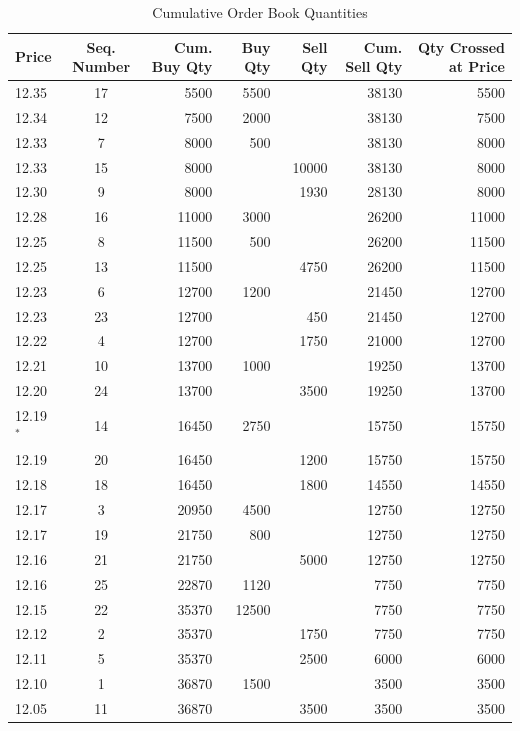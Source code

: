 	\begin{table}[!ht]
   	\centering
   	\caption{Cumulative Order Book Quantities \label{tab:openAuct3}}
   	\begin{tabular}{lcrrrrr}
	Price & Seq. Number & Cum. Buy Qty & Buy Qty & Sell Qty & Cum. Sell Qty & Qty Crossed at Price \\ \hline
	12.35 &  17 & 5500  & 5500 &  & 38130 & 5500 \\
	12.34 & 12 & 7500 & 2000 & & 38130 & 7500  \\	
	12.33 & 7  &  8000 & 500 &  & 38130 & 8000 \\	
	12.33 &  15 & 8000 &  & 10000 & 38130 & 8000 \\	
	12.30 & 9 & 8000 & & 1930 & 28130 & 8000 \\					
	12.28 &  16 & 11000  & 3000 &  & 26200 & 11000 \\	
	12.25 & 8 &  11500 & 500 & & 26200 & 11500 \\	
	12.25 & 13 & 11500 & & 4750 & 26200 & 11500 \\	
	12.23 & 6 &  12700 & 1200 & & 21450 & 12700 \\		
	12.23 &  23 & 12700 & & 450 & 21450 & 12700 \\
	12.22 & 4  & 12700 & & 1750 & 21000 & 12700 \\	
	12.21  & 10 & 13700  & 1000 & & 19250 & 13700 \\		
	12.20 &  24 & 13700 & & 3500 & 19250 & 13700 \\	
	12.19$^*$ &  14 & 16450  & 2750 &  & 15750 & 15750 \\		
	12.19 &  20 & 16450 & & 1200 & 15750 & 15750 \\
	12.18 &  18 & 16450 & & 1800 & 14550 & 14550 \\
	12.17 & 3  &  20950 & 4500  & & 12750 & 12750 \\		
	12.17 &  19 & 21750 & 800 & & 12750 & 12750 \\			
	12.16 &  21 & 21750 & & 5000 & 12750 & 12750 \\
	12.16 &  25 & 22870 & 1120 & & 7750 & 7750 \\		
	12.15  &  22 & 35370 & 12500 & & 7750 & 7750 \\
	12.12  & 2  & 35370 & & 1750 & 7750 & 7750 \\		
	12.11  & 5  & 35370 & & 2500 & 6000 & 6000 \\				
	12.10 & 1  &  36870 & 1500 & & 3500 & 3500 \\
	12.05  & 11 & 36870 & & 3500 & 3500 & 3500 	
   	\end{tabular}
	\end{table}


